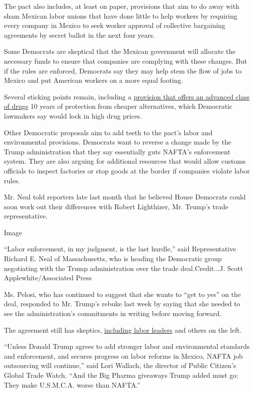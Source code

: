 The pact also includes, at least on paper, provisions that aim to do
away with sham Mexican labor unions that have done little to help
workers by requiring every company in Mexico to seek worker approval of
collective bargaining agreements by secret ballot in the next four
years.

Some Democrats are skeptical that the Mexican government will allocate
the necessary funds to ensure that companies are complying with these
changes. But if the rules are enforced, Democrats say they may help stem
the flow of jobs to Mexico and put American workers on a more equal
footing.

Several sticking points remain, including a
\href{https://www.nytimes.com/2019/03/21/us/politics/nafta-drug-prices.html}{provision
that offers an advanced class of drugs} 10 years of protection from
cheaper alternatives, which Democratic lawmakers say would lock in high
drug prices.

Other Democratic proposals aim to add teeth to the pact's labor and
environmental provisions. Democrats want to reverse a change made by the
Trump administration that they say essentially guts NAFTA's enforcement
system. They are also arguing for additional resources that would allow
customs officials to inspect factories or stop goods at the border if
companies violate labor rules.

Mr. Neal told reporters late last month that he believed House Democrats
could soon work out their differences with Robert Lighthizer, Mr.
Trump's trade representative.

Image

``Labor enforcement, in my judgment, is the last hurdle,'' said
Representative Richard E. Neal of Massachusetts, who is heading the
Democratic group negotiating with the Trump administration over the
trade deal.Credit...J. Scott Applewhite/Associated Press

Ms. Pelosi, who has continued to suggest that she wants to ``get to
yes'' on the deal, responded to Mr. Trump's rebuke last week by saying
that she needed to see the administration's commitments in writing
before moving forward.

The agreement still has skeptics,
\href{https://www.nytimes.com/2019/05/29/us/politics/pelosi-trump-nafta-deal.html}{including
labor leaders} and others on the left.

``Unless Donald Trump agrees to add stronger labor and environmental
standards and enforcement, and secures progress on labor reforms in
Mexico, NAFTA job outsourcing will continue,'' said Lori Wallach, the
director of Public Citizen's Global Trade Watch. ``And the Big Pharma
giveaways Trump added must go: They make U.S.M.C.A. worse than NAFTA.''

